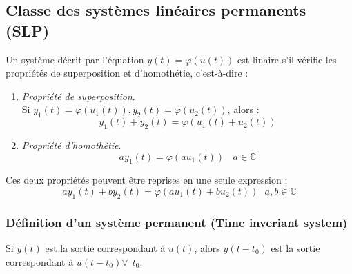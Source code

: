 \subsection{Classe des systèmes linéaires permanents (SLP)}
Un système décrit par l'équation $y(t) = \varphi(u(t))$ est linaire s'il 
vérifie les propriétés de superposition et d’homothétie, c'est-à-dire :
\begin{enumerate}
	\item \textit{Propriété de superposition}.\\
	      Si $y_1(t) = \varphi(u_1(t)), y_2(t) = \varphi(u_2(t))$, alors :
	      \begin{equation}
	      	y_1(t)+y_2(t) = \varphi(u_1(t) + u_2(t))
	      \end{equation}
	\item \textit{Propriété d’homothétie}.\\
	      \begin{equation}
	      	ay_1(t) = \varphi(au_1(t))\ \ \ \ a \in \mathbb{C}
	      \end{equation}
\end{enumerate}	
Ces deux propriétés peuvent être reprises en une seule expression :
\begin{equation}
	ay_1(t) + by_2(t) = \varphi(au_1(t) + bu_2(t))\ \ \ a,b\in\mathbb{C}
\end{equation}		
	
	
\subsubsection{Définition d'un système permanent (Time inveriant 
system)}
Si $y(t)$ est la sortie correspondant à $u(t)$, alors $y(t-t_0)$ 
est la sortie correspondant à $u(t-t_0) \forall\ \ t_0$.
		
	
	
	
	
	
	
	
	
	
	
	